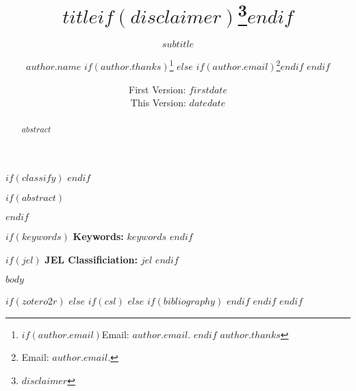 \documentclass[$if(fontsize)$$fontsize$$else$12pt$endif$,$for(classoption)$$classoption$$sep$,$endfor$]{article}
\title{$title$$if(disclaimer)$\thanks{$disclaimer$}$endif$}
\subtitle{$subtitle$}
\author{$author.name$%
        $if(author.thanks)$\thanks{%
            $if(author.email)$Email: $author.email$. $endif$%
            $author.thanks$}%
        $else$%
            $if(author.email)$\thanks{Email:  $author.email$.}$endif$%
        $endif$}
\affil{$author.affil$}
\date{First Version:  $firstdate$ \\[0.5em] This Version:  $date$}
\date{$date$}
\begin{document}
\maketitle
\thispagestyle{fancy}
$if(classify)$
$endif$

$if(abstract)$
\justifying
\begin{abstract}
\justify $abstract$
\end{abstract}
\RaggedRight
\smallskip
$endif$

$if(keywords)$
\hspace{4mm}\textbf{Keywords:}  $keywords$
\smallskip
$endif$

$if(jel)$
\hspace{4mm}\textbf{JEL Classificiation:} $jel$
$endif$

\clearpage
{}
\fancyfoot[C]{\thepage}
\doublespacing
\RaggedRight
\setlength\parindent{1.5em}

$body$

$if(zotero2r)$
  \newpage
  \printbibliography
$else$
  $if(csl)$
  \newpage
  \singlespacing
  \setlength\parindent{-0.5em}
  $else$
    $if(bibliography)$
      \newpage
      \printbibliography[title={References}]
    $endif$
  $endif$
$endif$
\end{document}
